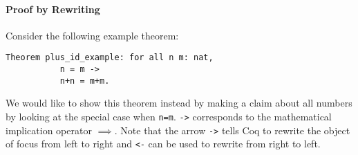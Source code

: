 	     \paragraph{Proof by Rewriting} \label{par:ProofByRewriting}
	     
	     Consider the following example theorem:     
		 \begin{lstlisting}[caption=\lstinline!plus_id_examples!]
		 Theorem plus_id_example: for all n m: nat,
	       n = m -> 
		   n+n = m+m.	 
		 \end{lstlisting}
		 We would like to show this theorem instead by making a claim about all numbers by looking at the special case when \lstinline!n=m!.
	     \lstinline!->! corresponds to the mathematical implication operator $\implies$. 
	     Note that the arrow \lstinline!->! tells Coq to rewrite the object of focus from left to right and \lstinline!<-! can be used to rewrite from right to left.\\
	     
